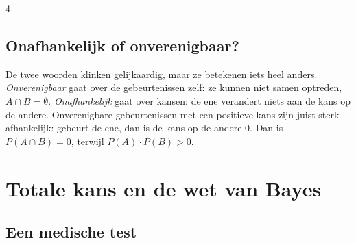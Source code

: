 \begin{alleenvoor}{4}
\subsection{Onafhankelijk of onverenigbaar?}

De twee woorden klinken gelijkaardig, maar ze betekenen iets heel anders. \textit{Onverenigbaar} gaat over de gebeurtenissen zelf: ze kunnen niet samen optreden, $A \cap B = \emptyset$. \textit{Onafhankelijk} gaat over kansen: de ene verandert niets aan de kans op de andere. Onverenigbare gebeurtenissen met een positieve kans zijn juist sterk afhankelijk: gebeurt de ene, dan is de kans op de andere 0. Dan is $P(A \cap B) = 0$, terwijl $P(A) \cdot P(B) > 0$.


\begin{oefeningen}
\end{oefeningen}
\end{alleenvoor}

\section{Totale kans en de wet van Bayes}

\subsection{Een medische test}

